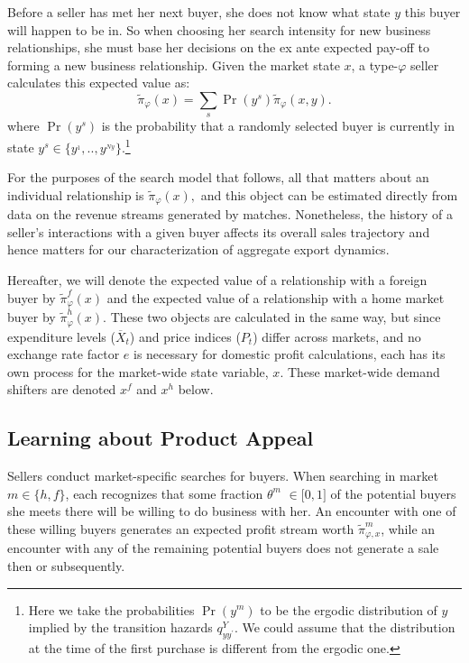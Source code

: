 Before a seller has met her next buyer, she does not know what state $y$
this buyer will happen to be in. So when choosing her search intensity for
new business relationships, she must base her decisions on the ex ante
expected pay-off to forming a new business relationship. Given the market
state $x$, a type-$\varphi $ seller calculates this expected value as:%
\begin{equation*}
\widetilde{\pi }_{\varphi }(x)=\sum_{s}\Pr (y^{s})\widetilde{\pi }_{\varphi
}(x,y).
\end{equation*}%
where $\Pr (y^{s})$ is the probability that a randomly selected buyer is
currently in state $y^{s}\in \{y^{_{1}},..,y^{_{Ny}}\}$.\footnote{%
Here we take the probabilities $\Pr (y^{m})$ to be the ergodic distribution
of $y$ implied by the transition hazards $q_{yy^{\prime }}^{Y}.$ We could
assume that the distribution at the time of the first purchase is different
from the ergodic one.\medskip}

For the purposes of the search model that follows, all that matters about an
individual relationship is $\widetilde{\pi }_{\varphi }(x),$ and this object
can be estimated directly from data on the revenue streams generated by
matches. Nonetheless, the history of a seller's interactions with a given
buyer affects its overall sales trajectory and hence matters for our
characterization of aggregate export dynamics.

Hereafter, we will denote the expected value of a relationship with a
foreign buyer by $\widetilde{\pi }_{\varphi }^{f}(x)$ and the expected value
of a relationship with a home market buyer by $\widetilde{\pi }_{\varphi
}^{h}(x).$ These two objects are calculated in the same way, but since
expenditure levels ($\overline{X}_{t}$) and price indices ($P_{t}$) differ
across markets, and no exchange rate factor $e$ is necessary for domestic
profit calculations, each has its own process for the market-wide state
variable, $x.$ These market-wide demand shifters are denoted $x^{f}$ and $%
x^{h}$ below$.$

\subsection{Learning about Product Appeal}

Sellers conduct market-specific searches for buyers. When searching in
market $m\in \{h,f\}$, each recognizes that some fraction $\theta ^{m}$ $\in
\lbrack 0,1]$ of the potential buyers she meets there will be willing to do
business with her. An encounter with one of these willing buyers generates
an expected profit stream worth $\widetilde{\pi }_{\varphi ,x}^{m}$, while
an encounter with any of the remaining potential buyers does not generate a
sale then or subsequently.

